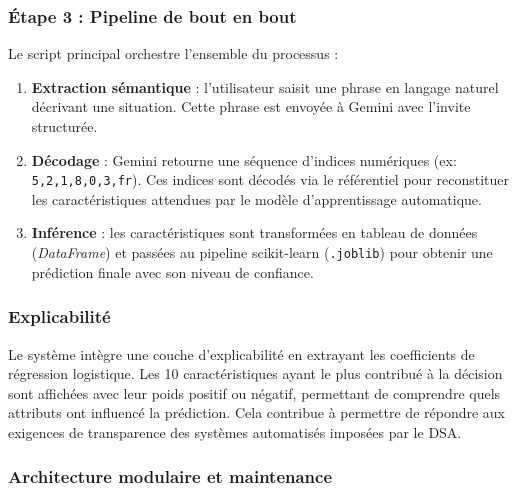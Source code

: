 \documentclass[10pt,twocolumn,a4paper]{article}
\begin{document}
\subsubsection{Étape 3 : Pipeline de bout en bout}

Le script principal orchestre l'ensemble du processus :

\begin{enumerate}
    \item \textbf{Extraction sémantique} : l'utilisateur saisit une phrase en langage naturel décrivant une situation. Cette phrase est envoyée à Gemini avec l'invite structurée.
    \item \textbf{Décodage} : Gemini retourne une séquence d'indices numériques (ex: \texttt{5,2,1,8,0,3,fr}). Ces indices sont décodés via le référentiel pour reconstituer les caractéristiques attendues par le modèle d'apprentissage automatique.
    \item \textbf{Inférence} : les caractéristiques sont transformées en tableau de données (\textit{DataFrame}) et passées au pipeline scikit-learn (\texttt{.joblib}) pour obtenir une prédiction finale avec son niveau de confiance.
\end{enumerate}

\subsubsection{Explicabilité}

Le système intègre une couche d'explicabilité en extrayant les coefficients de régression logistique. Les 10 caractéristiques ayant le plus contribué à la décision sont affichées avec leur poids positif ou négatif, permettant de comprendre quels attributs ont influencé la prédiction. Cela contribue à permettre de répondre aux exigences de transparence des systèmes automatisés imposées par le DSA.

\subsubsection{Architecture modulaire et maintenance}
\end{document}
